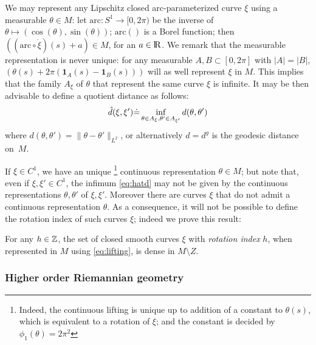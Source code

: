 \documentclass[twoside,a4paper,english]{article}
\begin{document}
\smallskip

We may represent any  Lipschitz closed arc-parameterized curve $\xi$ 
using a measurable $\theta\in M$:
{\def\arc{\mbox{arc}}
  let $\arc:S^1\to [0,2\pi)$ be the inverse of
  $\theta\mapsto(\cos(\theta),\sin(\theta))$; $\arc()$ is a Borel function;
  then $((\arc\circ\dot \xi)(s)+a)\in M$, for an $a\in{\protect\mathrm{l\hskip-0.15em R}}$.}
We remark that the
measurable representation is never unique: for any measurable
$A,B\subset[0,2\pi]$ with $|A|=|B|$,
$(\theta(s)+2\pi({\mathbf 1}_A(s)-{\mathbf 1}_B(s)))$ will
as well represent $\xi$ in $M$. This implies that the family
$A_\xi$ of $\theta$ that represent the same curve $\xi$ 
is infinite. It may be then advisable to define a
quotient distance as follows:
\begin{equation}
  \label{eq:hatd}
  \hat d(\xi,\xi') {\stackrel{\mbox{.}}{=}} \inf_{\theta\in A_\xi,
  \theta'\in A_{\xi'}} d(\theta,\theta')
\end{equation}
where $d(\theta,\theta')=\|\theta-\theta'\|_{L^2}$, or alternatively
$d=d^g$ is the geodesic distance on~$M$.

If $\xi\in C^1$, we have an unique%
\footnote{Indeed, the continuous lifting is unique up to addition of a
  constant to $\theta(s)$, which is equivalent to
  a rotation of $\xi$; and the constant is decided by 
  $\phi_1(\theta)=2\pi^2$
}  continuous representation $\theta\in M$; but note that,
even if $\xi,\xi'\in C^1$, the infimum \eqref{eq:hatd}
may not be given by the continuous representations $\theta,\theta'$
of  $\xi,\xi'$. Moreover there are curves $\xi$ that do not
admit a continuous representation $\theta$. As a consequence, it will not be
possible to define the rotation index of such curves $\xi$; indeed
we prove this result:
\begin{Proposition}\label{prop: no rotation Srivastava}
  For any $h\in{\protect\mathbb{Z}}$, the set of closed smooth curves
  $\xi$ with \emph{rotation index} $h$, when represented in $M$
  using \eqref{eq:lifting}, is dense in $M\setminus Z$.
\end{Proposition}



\subsubsection{Higher order Riemannian geometry}
\end{document}
